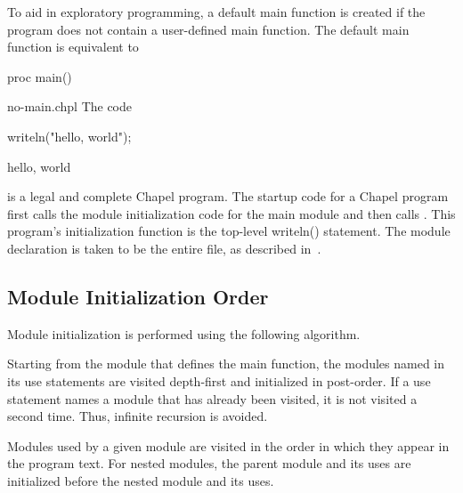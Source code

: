 

To aid in exploratory programming, a default main function is
created if the program does not contain a user-defined main function.  The
default main function is equivalent to
\begin{chapel}
proc main() {}
\end{chapel}

\begin{chapelexample}{no-main.chpl}
The code
\begin{chapel}
writeln("hello, world");
\end{chapel}
\begin{chapeloutput}
hello, world
\end{chapeloutput}
is a legal and complete Chapel program.  The startup code for a Chapel program
first calls the module initialization code for the main module and then
calls .  This program's initialization function is the top-level
writeln() statement.  The module declaration is taken to be the entire file,
as described in~.
\end{chapelexample}


\subsection{Module Initialization Order}
\label{Module_Initialization_Order}

Module initialization is performed using the following algorithm.

Starting from the module that defines the main function, the modules named in
its use statements are visited depth-first and initialized in post-order.  If a
use statement names a module that has already been visited, it is not visited a
second time.  Thus, infinite recursion is avoided.

Modules used by a given module are visited in the order in which
they appear in the program text.  For nested modules, the
parent module and its uses are initialized before the nested module and its uses.

